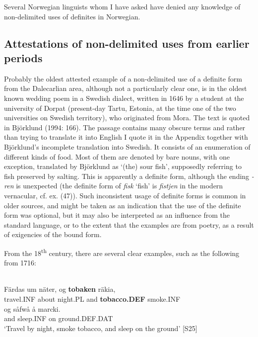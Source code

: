 \z

Several Norwegian linguists whom I have asked have denied any knowledge of non-delimited uses of definites in Norwegian. 


\subsection{ Attestations of non-delimited uses from earlier periods}
\label{bkm:Ref154983425}
Probably the oldest attested example of a non-delimited use of a definite form from the Dalecarlian area, although not a particularly clear one, is in the oldest known wedding poem in a Swedish dialect, written in 1646 by a student at the university of Dorpat (present-day Tartu, Estonia, at the time one of the two universities on Swedish territory), who originated from Mora. The text is quoted in Björklund (1994: 166). The passage contains many obscure terms and rather than trying to translate it into English I quote it in the Appendix together with Björklund’s incomplete translation into Swedish. It consists of an enumeration of different kinds of food. Most of them are denoted by bare nouns, with one exception, translated by Björklund as  ‘(the) sour fish’, supposedly referring to fish preserved by salting. This is apparently a definite form, although the ending \textit{{}-ren} is unexpected (the definite form of \textit{fisk} ‘fish’ is \textit{fistjen} in the modern vernacular, cf. ex. (47)). Such inconsistent usage of definite forms is common in older sources, and might be taken as an indication that the use of the definite form was optional, but it may also be interpreted as an influence from the standard language, or to the extent that the examples are from poetry, as a result of exigencies of the bound form. 


From the 18\textsuperscript{th} century, there are several clear examples, such as the following from 1716:


\ea \label{} 
\\
\gll Färdas  um  näter,  og  \textbf{tobaken} räkia,\\
travel.INF  about  night.PL  and  \textbf{tobacco.DEF} smoke.INF\\
\gll og  såfwå  å  marcki.\\
and  sleep.INF  on   ground.DEF.DAT\\
\glt ‘Travel by night, smoke tobacco, and sleep on the ground’ [S25] 

